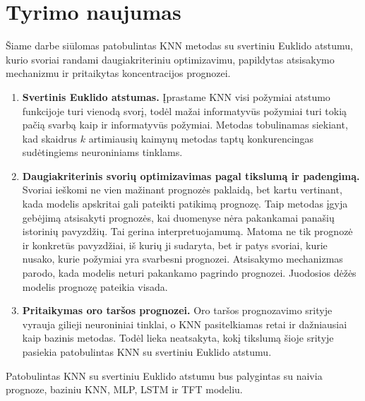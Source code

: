 \documentclass[]{VUMIFTemplateClass}
\begin{document}


    \section{Tyrimo naujumas}

    Šiame darbe siūlomas patobulintas KNN metodas su svertiniu Euklido atstumu, kurio svoriai randami daugiakriteriniu optimizavimu, papildytas atsisakymo mechanizmu ir pritaikytas  koncentracijos prognozei.

    \begin{enumerate}

        \item \textbf{Svertinis Euklido atstumas.}
        Įprastame KNN visi požymiai atstumo funkcijoje turi vienodą svorį, todėl mažai informatyvūs požymiai turi tokią pačią svarbą kaip ir informatyvūs požymiai.
        Metodas tobulinamas siekiant, kad skaidrus $k$ artimiausių kaimynų metodas taptų konkurencingas sudėtingiems neuroniniams tinklams.

        \item \textbf{Daugiakriterinis svorių optimizavimas pagal tikslumą ir padengimą.}
        Svoriai ieškomi ne vien mažinant prognozės paklaidą, bet kartu vertinant, kada modelis apskritai gali pateikti patikimą prognozę.
        Taip metodas įgyja gebėjimą atsisakyti prognozės, kai duomenyse nėra pakankamai panašių istorinių pavyzdžių.
        Tai gerina interpretuojamumą.
        Matoma ne tik prognozė ir konkretūs pavyzdžiai, iš kurių ji sudaryta, bet ir patys svoriai, kurie nusako, kurie požymiai yra svarbesni prognozei.
        Atsisakymo mechanizmas parodo, kada modelis neturi pakankamo pagrindo prognozei.
        Juodosios dėžės modelis prognozę pateikia visada.

        \item \textbf{Pritaikymas oro taršos prognozei.}
        Oro taršos prognozavimo srityje vyrauja gilieji neuroniniai tinklai, o KNN pasitelkiamas retai ir dažniausiai kaip bazinis metodas.
        Todėl lieka neatsakyta, kokį tikslumą šioje srityje pasiekia patobulintas KNN su svertiniu Euklido atstumu.

    \end{enumerate}

    Patobulintas KNN su svertiniu Euklido atstumu bus palygintas su naivia prognoze, baziniu KNN, MLP, LSTM ir TFT modeliu.
\end{document}
